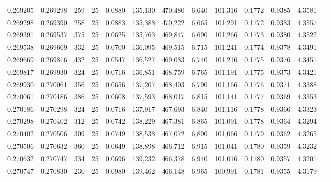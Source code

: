 \begin{tabular}{rrrrrrrrrrrrr}
0.269205 & 0.269298 &   259 &  25 &                                     0.0880 & 135,130 & 470,480 &   6,640 & 101,316 & 0.1772 & 0.9385 & 4.3581 \\
0.269298 & 0.269390 &   258 &  25 &                                     0.0883 & 135,388 & 470,222 &   6,665 & 101,291 & 0.1772 & 0.9383 & 4.3557 \\
0.269391 & 0.269537 &   375 &  25 &                                     0.0625 & 135,763 & 469,847 &   6,690 & 101,266 & 0.1773 & 0.9380 & 4.3522 \\
0.269538 & 0.269669 &   332 &  25 &                                     0.0700 & 136,095 & 469,515 &   6,715 & 101,241 & 0.1774 & 0.9378 & 4.3491 \\
0.269669 & 0.269816 &   432 &  25 &                                     0.0547 & 136,527 & 469,083 &   6,740 & 101,216 & 0.1775 & 0.9376 & 4.3451 \\
0.269817 & 0.269930 &   324 &  25 &                                     0.0716 & 136,851 & 468,759 &   6,765 & 101,191 & 0.1775 & 0.9373 & 4.3421 \\
0.269930 & 0.270061 &   356 &  25 &                                     0.0656 & 137,207 & 468,403 &   6,790 & 101,166 & 0.1776 & 0.9371 & 4.3388 \\
0.270061 & 0.270186 &   386 &  25 &                                     0.0608 & 137,593 & 468,017 &   6,815 & 101,141 & 0.1777 & 0.9369 & 4.3353 \\
0.270186 & 0.270298 &   324 &  25 &                                     0.0716 & 137,917 & 467,693 &   6,840 & 101,116 & 0.1778 & 0.9366 & 4.3323 \\
0.270298 & 0.270402 &   312 &  25 &                                     0.0742 & 138,229 & 467,381 &   6,865 & 101,091 & 0.1778 & 0.9364 & 4.3294 \\
0.270402 & 0.270506 &   309 &  25 &                                     0.0749 & 138,538 & 467,072 &   6,890 & 101,066 & 0.1779 & 0.9362 & 4.3265 \\
0.270506 & 0.270632 &   360 &  25 &                                     0.0649 & 138,898 & 466,712 &   6,915 & 101,041 & 0.1780 & 0.9359 & 4.3232 \\
0.270632 & 0.270747 &   334 &  25 &                                     0.0696 & 139,232 & 466,378 &   6,940 & 101,016 & 0.1780 & 0.9357 & 4.3201 \\
0.270747 & 0.270830 &   230 &  25 &                                     0.0980 & 139,462 & 466,148 &   6,965 & 100,991 & 0.1781 & 0.9355 & 4.3179 \\

\end{tabular}
